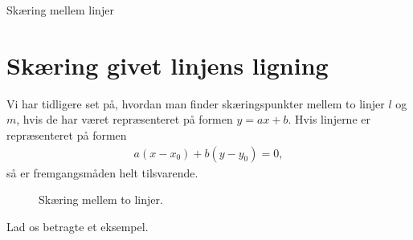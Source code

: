 
\begin{center}
\Huge
Skæring mellem linjer
\end{center}

\section*{Skæring givet linjens ligning}

Vi har tidligere set på, hvordan man finder skæringspunkter mellem to linjer $l$ og $m$, hvis de har været repræsenteret på formen $y = ax+b$. Hvis linjerne er repræsenteret på formen 
\begin{align*}
	a(x-x_0) + b(y-y_0) = 0, 
\end{align*}
så er fremgangsmåden helt tilsvarende. 
\begin{figure}[H]
	\centering
	\caption{Skæring mellem to linjer.}
	\label{fig:linjeligning}
\end{figure}
Lad os betragte et eksempel.
